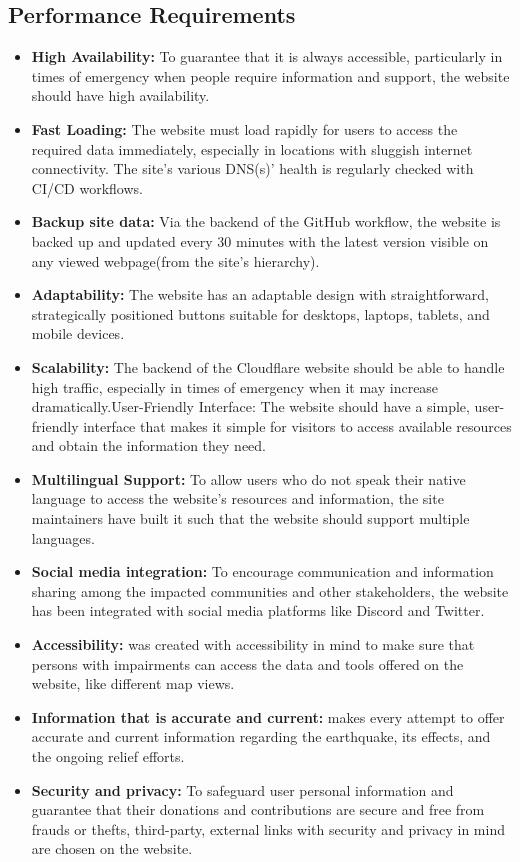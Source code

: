 \subsection{Performance Requirements}

\begin{itemize}
    \item \textbf{High Availability:} To guarantee that it is always accessible, particularly in times of emergency when people require information and support, the \afetbilgi website should have high availability.
    \item \textbf{Fast Loading:} The website must load rapidly for users to access the required data immediately, especially in locations with sluggish internet connectivity. The site's various DNS(s)' health is regularly checked with CI/CD workflows.
    \item \textbf{Backup site data:} Via the backend of the GitHub workflow, the website is backed up and updated every 30 minutes with the latest version visible on any viewed webpage(from the site's hierarchy).
    \item \textbf{Adaptability:} The website has an adaptable design with straightforward, strategically positioned buttons suitable for desktops, laptops, tablets, and mobile devices.
    \item \textbf{Scalability:} The backend of the Cloudflare website should be able to handle high traffic, especially in times of emergency when it may increase dramatically.User-Friendly Interface: The website should have a simple, user-friendly interface that makes it simple for visitors to access available resources and obtain the information they need.
    \item \textbf{Multilingual Support:} To allow users who do not speak their native language to access the website's resources and information, the site maintainers have built it such that the website should support multiple languages.
    \item \textbf{Social media integration:} To encourage communication and information sharing among the impacted communities and other stakeholders, the website has been integrated with social media platforms like Discord and Twitter.
    \item \textbf{Accessibility:} \afetbilgi was created with accessibility in mind to make sure that persons with impairments can access the data and tools offered on the website, like different map views.
    \item \textbf{Information that is accurate and current:} \afetbilgi makes every attempt to offer accurate and current information regarding the earthquake, its effects, and the ongoing relief efforts.
    \item \textbf{Security and privacy:} To safeguard user personal information and guarantee that their donations and contributions are secure and free from frauds or thefts, third-party, external links with security and privacy in mind are chosen on the \afetbilgi website.
\end{itemize}

